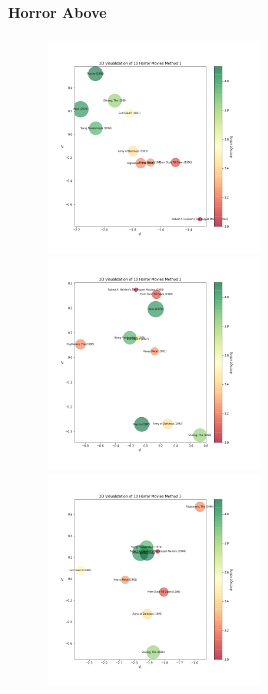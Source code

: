 \documentclass{article}
\begin{document}
\newpage

\paragraph{Horror Above}

\begin{figure}[H]
\includegraphics[width=0.5\textwidth]{matrixfactorization/2D Visualization of 10 Horror Movies Method 1.png}
\includegraphics[width=0.5\textwidth]{matrixfactorization/2D Visualization of 10 Horror Movies Method 2.png}
\includegraphics[width=0.5\textwidth]{matrixfactorization/2D Visualization of 10 Horror Movies Method 3.png}
\end{figure}
\end{document}
